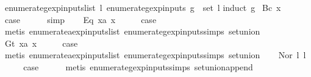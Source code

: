 \begin{isabellebody}
\isanewline
{}\isamarkupfalse%
\ enumerate{\isacharunderscore}gexp{\isacharunderscore}inputs{\isacharunderscore}list{\isacharcolon}\ {\isachardoublequoteopen}{\isasymexists}l{\isachardot}\ enumerate{\isacharunderscore}gexp{\isacharunderscore}inputs\ g\ {\isacharequal}\ set\ l{\isachardoublequoteclose}\isanewline
%
\isadelimproof
%
\endisadelimproof
%
\isatagproof
{}\isamarkupfalse%
{\isacharparenleft}induct\ g{\isacharparenright}\isanewline
{}\isamarkupfalse%
\ {\isacharparenleft}Bc\ x{\isacharparenright}\isanewline
\ \ \isamarkupfalse%
\ \isamarkupfalse%
\ {\isacharquery}case\isanewline
\ \ \ \ \isamarkupfalse%
\ simp\isanewline
{}\isamarkupfalse%
\isanewline
\ \ \isamarkupfalse%
\ {\isacharparenleft}Eq\ x{}a\ x{}{\isacharparenright}\isanewline
\ \ \isamarkupfalse%
\ \isamarkupfalse%
\ {\isacharquery}case\isanewline
\ \ \ \ \isamarkupfalse%
\ {\isacharparenleft}metis\ enumerate{\isacharunderscore}aexp{\isacharunderscore}inputs{\isacharunderscore}list\ enumerate{\isacharunderscore}gexp{\isacharunderscore}inputs{\isachardot}simps{\isacharparenleft}{}{\isacharparenright}\ set{\isacharunderscore}union{\isacharparenright}\isanewline
{}\isamarkupfalse%
\isanewline
\ \ \isamarkupfalse%
\ {\isacharparenleft}Gt\ x{}a\ x{}{\isacharparenright}\isanewline
\ \ \isamarkupfalse%
\ \isamarkupfalse%
\ {\isacharquery}case\isanewline
\ \ \ \ \isamarkupfalse%
\ {\isacharparenleft}metis\ enumerate{\isacharunderscore}aexp{\isacharunderscore}inputs{\isacharunderscore}list\ enumerate{\isacharunderscore}gexp{\isacharunderscore}inputs{\isachardot}simps{\isacharparenleft}{}{\isacharparenright}\ set{\isacharunderscore}union{\isacharparenright}\isanewline
{}\isamarkupfalse%
\isanewline
\ \ \isamarkupfalse%
\ {\isacharparenleft}Nor\ l{}\ l{}{\isacharparenright}\isanewline
\ \ \isamarkupfalse%
\ \isamarkupfalse%
\ {\isacharquery}case\isanewline
\ \ \ \ \isamarkupfalse%
\ {\isacharparenleft}metis\ enumerate{\isacharunderscore}gexp{\isacharunderscore}inputs{\isachardot}simps{\isacharparenleft}{}{\isacharparenright}\ set{\isacharunderscore}union{\isacharunderscore}append{\isacharparenright}\isanewline
{}\isamarkupfalse%
\isanewline
\ \ \isamarkupfalse%

\end{isabellebody}

